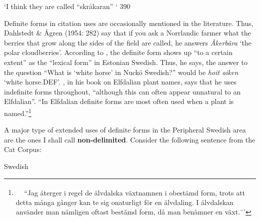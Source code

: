 \begin{styleTranslation}
‘I think they are called “skråkaran” ‘ 390

\end{styleTranslation}

\begin{styleBodyTextFirst}
Definite forms in citation uses are occasionally mentioned in the literature. Thus, Dahlstedt \& Ågren (1954: 282) say that if you ask a Norrlandic farmer what the berries that grow along the sides of the field are called, he answers \textit{Åkerbära} ‘the polar cloudberries’. According to \citet[82]{Lagman1979}, the definite form shows up “to a certain extent” as the “lexical form” in Estonian Swedish. Thus, he says, the answer to the question “What is ‘white horse’ in Nuckö Swedish?” would be \textit{hoit aiken} ‘white horse.DEF’. \citet[8]{Steensland1994}, in his book on Elfdalian plant names, says that he uses indefinite forms throughout, “although this can often appear unnatural to an Elfdalian”.  “In Elfdalian definite forms are most often used when a plant is named.”\footnote{\textsuperscript{\ \ } “Jag återger i regel de älvdalska växtnamnen i obestämd form, trots att detta många gånger kan te sig onaturligt för en älvdaling. I älvdalskan använder man nämligen oftast bestämd form, då man benämner en växt.¨’}

\end{styleBodyTextFirst}

\label{bkm:Ref105226557}
\begin{styleBodyTextFirst}
A major type of extended uses of definite forms in the Peripheral Swedish area are the ones I shall call \textbf{non-delimited}. Consider the following sentence from the Cat Corpus: 

\end{styleBodyTextFirst}

\begin{listWWNumileveli}
\item 

\end{listWWNumileveli}

\begin{listWWNumxxiileveli}
\item 

\begin{styleExLtrTbl}
Swedish

\end{styleExLtrTbl}

\end{listWWNumxxiileveli}

